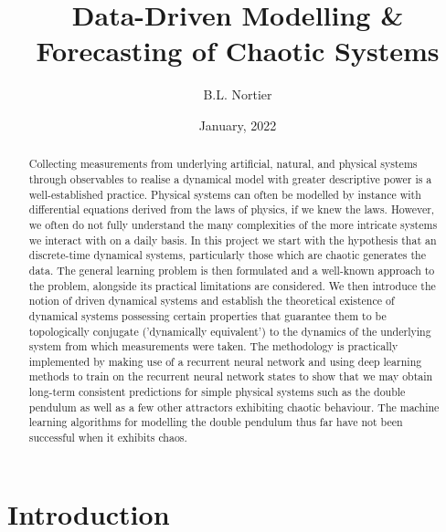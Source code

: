 \documentclass[a4paper,12pt,twoside]{report}
\begin{document}
\title{Data-Driven Modelling \& \\ Forecasting of Chaotic Systems}



\author{B.L. Nortier} 
\date{January, 2022}
\date{}
\maketitle


\begin{abstract}
  Collecting measurements from underlying artificial, natural, and physical systems through observables to realise a dynamical model with greater descriptive power is a well-established practice. Physical systems can often be modelled by instance with differential equations derived from the laws of physics, if we knew the laws.  However, we often do not fully understand the many complexities of the more intricate systems we interact with on a daily basis.
  In this project we start with the hypothesis that an discrete-time dynamical systems, particularly those which are chaotic generates the data. The general learning problem is then formulated and a well-known approach to the problem, alongside its practical limitations are considered.
  We then introduce the notion of driven dynamical systems and establish the theoretical existence of dynamical systems possessing certain properties that guarantee them to be topologically conjugate ('dynamically equivalent') to the dynamics of the underlying system from which measurements were taken. The methodology is practically implemented by making use of a recurrent neural network and using deep learning methods to train on the recurrent neural network states to show that we may obtain long-term consistent predictions for simple physical systems such as the double pendulum as well as a few other attractors exhibiting chaotic behaviour. The machine learning algorithms for modelling the double pendulum thus far have not been successful when it exhibits chaos. 


  \end{abstract}

  \tableofcontents

\chapter{Introduction}\label{ch1}
\end{document}
